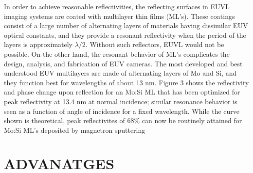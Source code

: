 \documentclass[12pt,a4paper]{report}
\begin{document}
In order to achieve reasonable reflectivities, the reflecting
surfaces in EUVL imaging systems are coated with
multilayer thin films (ML’s). These coatings consist of a
large number of alternating layers of materials having
dissimilar EUV optical constants, and they provide a
resonant reflectivity when the period of the layers is
approximately $\lambda/2$. Without such reflectors, EUVL
would not be possible. On the other hand, the resonant
behavior of ML’s complicates the design, analysis, and
fabrication of EUV cameras. The most developed and
best understood EUV multilayers are made of alternating
layers of Mo and Si, and they function best for
wavelengths of about 13 nm. Figure 3 shows the
reflectivity and phase change upon reflection for an
Mo:Si ML that has been optimized for peak reflectivity at
13.4 nm at normal incidence; similar resonance behavior
is seen as a function of angle of incidence for a fixed
wavelength. While the curve shown is theoretical, peak
reflectivites of 68\% can now be routinely attained for
Mo:Si ML’s deposited by magnetron sputtering

\chapter{ADVANATGES}
\end{document}
